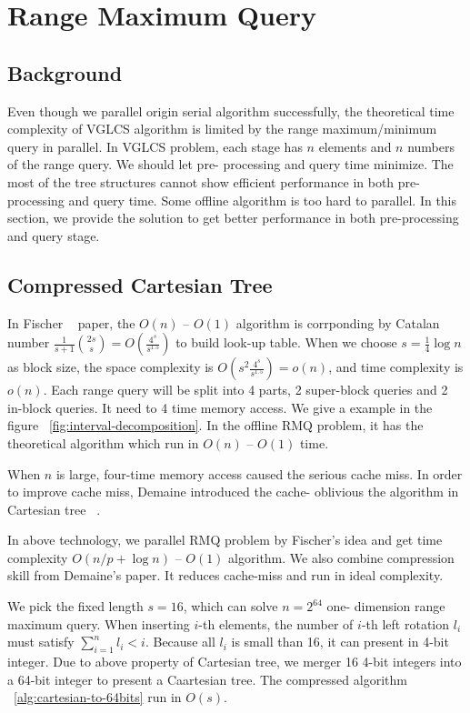 \section{Range Maximum Query}
\label{sec:parallelRMQ}

\subsection{Background}

Even though we parallel origin serial algorithm successfully, the
theoretical time complexity of VGLCS algorithm is limited by the range
maximum/minimum query in parallel.  In VGLCS problem, each stage has
$n$ elements and $n$ numbers of the range query.  We should let pre-
processing and query time minimize.  The most of the tree structures
cannot show efficient performance in both pre-processing and query
time.  Some offline algorithm is too hard to parallel.  In this
section, we provide the solution to get better performance in both
pre-processing and query stage.

\subsection{Compressed Cartesian Tree}

In Fischer ~\cite{Fischer2006TheoreticalAP} paper, the $O(n)$ -- $O(1)$ algorithm is
corrponding by Catalan number $\frac{1}{s+1}\binom{2s}{s} =
O(\frac{4^s}{s^{1.5}})$ to build look-up table.  When we choose $s =
\frac{1}{4} \log n$ as block size, the space complexity is $O(s^2
\frac{4^s}{s^{1.5}}) = o(n)$, and time complexity is $o(n)$.  Each
range query will be split into 4 parts, 2 super-block queries and 2
in-block queries. It need to 4 time memory access.  We give a example
in the figure ~\ref{fig:interval-decomposition}.  In the offline RMQ
problem, it has the theoretical algorithm which run in $O(n)$ --
$O(1)$ time.

When $n$ is large, four-time memory access caused the serious cache
miss. In order to improve cache miss, Demaine introduced the cache-
oblivious the algorithm in Cartesian tree ~\cite{Demaine2009OnCT}.

In above technology, we parallel RMQ problem by Fischer's idea and get
time complexity $O(n / p + \log n)$ -- $O(1)$ algorithm.  We also
combine compression skill from Demaine's paper. It reduces cache-miss
and run in ideal complexity.

We pick the fixed length $s = 16$, which can solve $n = 2^{64}$ one-
dimension range maximum query.  When inserting $i$-th elements, the
number of $i$-th left rotation $l_i$ must satisfy $\sum_{i=1}^{n} l_i
< i$.  Because all $l_i$ is small than 16, it can present in 4-bit
integer.  Due to above property of Cartesian tree, we merger 16 4-bit
integers into a 64-bit integer to present a Caartesian tree.  The
compressed algorithm ~\ref{alg:cartesian-to-64bits} run in $O(s)$.


